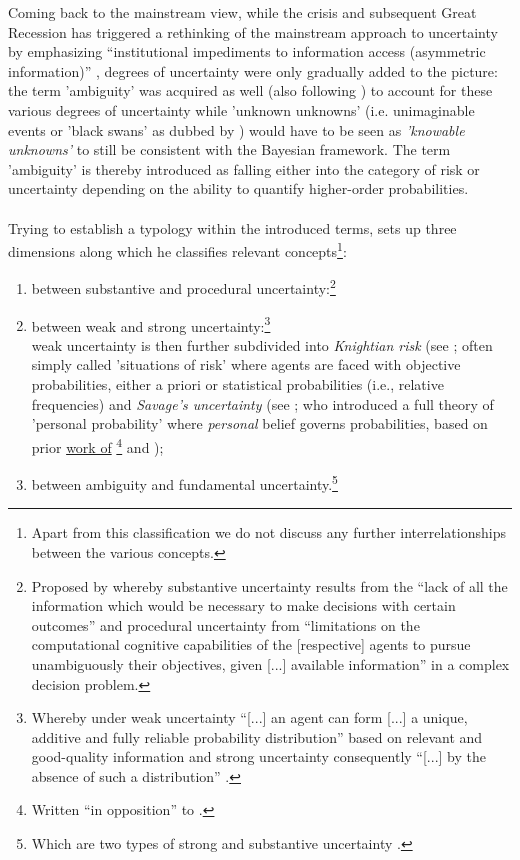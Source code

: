 \documentclass[a4paper,11pt,listof=nochaptergap,oneside,pointednumbers,bibtotoc,bigheadings,liststotoc,hidelinks]{scrbook}
\theoremstyle{mysatz}
\theoremstyle{mydefinition}
\theoremstyle{mytheorem}
\theoremstyle{mybemerkung}
\begin{document}
Coming back to the mainstream view, while the crisis and subsequent Great Recession has triggered a rethinking of the mainstream approach to uncertainty by emphasizing ``institutional impediments to information access (asymmetric information)'' \citep[p. 8]{dow:16}, degrees of uncertainty were only gradually added to the picture: the term 'ambiguity' was acquired as well (also following \citealp[p. 330]{camererandweber:92}) to account for these various degrees of uncertainty while 'unknown unknowns' (i.e. unimaginable events or 'black swans' as dubbed by \citealp{taleb:08}) would have to be seen as \textit{'knowable unknowns'} to still be consistent with the Bayesian framework. The term 'ambiguity' is thereby introduced as falling either into the category of risk or uncertainty depending on the ability to quantify higher-order probabilities.\\
\\
Trying to establish a typology within the introduced terms, \citet{dequech:14}  sets up three dimensions along which he classifies relevant concepts\footnote{Apart from this classification we do not discuss any further interrelationships between the various concepts.}: 
\begin{enumerate}
	\item between substantive and procedural uncertainty:\footnote{Proposed by \citet[p. 145]{dosiandegidi:91} whereby substantive uncertainty results from the ``lack of all the information which would be necessary to make decisions with certain outcomes'' and procedural uncertainty from ``limitations on the computational cognitive capabilities of the [respective] agents to pursue unambiguously their objectives, given [...] available information'' in a complex decision problem. }
	\item between weak and strong uncertainty:\footnote{Whereby under weak uncertainty ``[...] an agent can form [...] a unique, additive and fully reliable probability distribution'' based on relevant and good-quality information and strong uncertainty consequently ``[...] by the absence of such a distribution'' \citep[p. 622/623]{dequech:14}.} \\
	weak uncertainty is then further subdivided into \textit{Knightian risk} (see \citet{knight:21}; often simply called 'situations of risk' where agents are faced with objective probabilities, either a priori or statistical probabilities (i.e., relative frequencies) and \textit{Savage's uncertainty} (see \citet{savage:54}; who introduced a full theory of 'personal probability' where \textit{personal} belief governs probabilities, based on prior \href{https://archive.org/stream/in.ernet.dli.2015.223806/2015.223806.The-Foundations#page/n289/mode/2up}{work of} \href{http://www.brunodefinetti.it/Link/Subjective%20Expected%20Utility%20-%20Intro.htm}{\citet{ramsey:26}\footnote{Written ``in opposition'' to \citet{keynes:21}.} and \citet{finetti:37}});
	\item between ambiguity and fundamental uncertainty.\footnote{Which are two types of strong and substantive uncertainty \citep{dequesh:00}.}
\end{enumerate}
\vspace{1cm}
\end{document}
